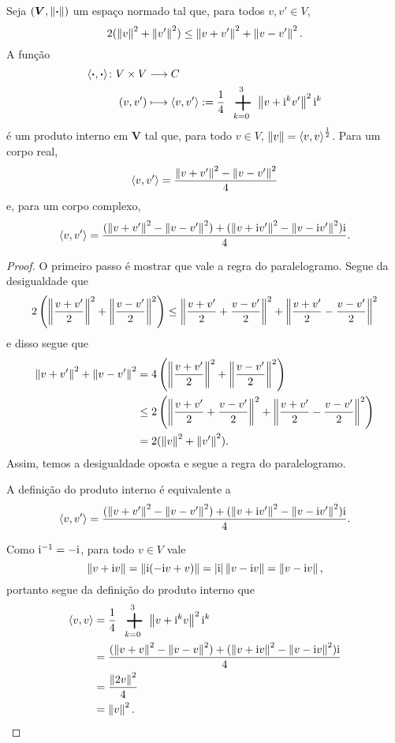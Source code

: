 \begin{proposition}
Seja $(\bm V,\left\Vert{\bm{\cdot}}\right\Vert)$ um espaço normado tal que, para todos $v,v' \in V$,
	\begin{equation*}
	2( \left\Vert{v}\right\Vert^2 + \left\Vert{v'}\right\Vert^2 ) \leq \left\Vert{v+v'}\right\Vert^2+\left\Vert{v-v'}\right\Vert^2.
	\end{equation*}
A função
	\begin{align*}
		\func{\inte{\var}{\var}}{V \times V}{C}{(v,v')}{\inte{v}{v'} := \frac{1}{4} \sum_{k=0}^{3} \nor{v+\ii^kv'}^2 \ii^k}
	\end{align*}
é um produto interno em $\bm V$ tal que, para todo $v \in V$, $\left\Vert{v}\right\Vert = \left\langle{v},{v}\right\rangle^{\frac{1}{2}}$. Para um corpo real,
	\begin{equation*}
	\left\langle{v},{v'}\right\rangle = \frac{\left\Vert{v+v'}\right\Vert^2 - \left\Vert{v-v'}\right\Vert^2}{4}
	\end{equation*}
e, para um corpo complexo,
	\begin{equation*}
	\left\langle{v},{v'}\right\rangle = \frac{(\left\Vert{v+v'}\right\Vert^2 - \left\Vert{v-v'}\right\Vert^2) + (\left\Vert{v+\mathrm{i}v'}\right\Vert^2 - \left\Vert{v-\mathrm{i}v'}\right\Vert^2) \mathrm{i}}{4}.
	\end{equation*}
\end{proposition}\begin{proof}
O primeiro passo é mostrar que vale a regra do paralelogramo. Segue da desigualdade que
	\begin{equation*}
		2\left( \left\Vert{\frac{v+v'}{2}}\right\Vert^2 + \left\Vert{\frac{v-v'}{2}}\right\Vert^2 \right) \leq \left\Vert{\frac{v+v'}{2} + \frac{v-v'}{2}}\right\Vert^2+\left\Vert{\frac{v+v'}{2} - \frac{v-v'}{2}}\right\Vert^2
	\end{equation*}
e disso segue que
	\begin{align*}
		\left\Vert{v+v'}\right\Vert^2 + \left\Vert{v-v'}\right\Vert^2 &= 4\left( \left\Vert{\frac{v+v'}{2}}\right\Vert^2 + \left\Vert{\frac{v-v'}{2}}\right\Vert^2 \right) \\
			&\leq 2\left( \left\Vert{\frac{v+v'}{2} + \frac{v-v'}{2}}\right\Vert^2+\left\Vert{\frac{v+v'}{2} - \frac{v-v'}{2}}\right\Vert^2 \right) \\
			&= 2(\left\Vert{v}\right\Vert^2 + \left\Vert{v'}\right\Vert^2).
	\end{align*}
Assim, temos a desigualdade oposta e segue a regra do paralelogramo.

A definição do produto interno é equivalente a
	\begin{equation*}
	\left\langle{v},{v'}\right\rangle = \frac{(\left\Vert{v+v'}\right\Vert^2 - \left\Vert{v-v'}\right\Vert^2) + (\left\Vert{v+\mathrm{i}v'}\right\Vert^2 - \left\Vert{v-\mathrm{i}v'}\right\Vert^2) \mathrm{i}}{4}.
	\end{equation*}

Como $\mathrm{i}^{-1} = -\mathrm{i}$, para todo $v \in V$ vale
	\begin{equation*}
	\left\Vert{v+\mathrm{i}v}\right\Vert = \left\Vert{\mathrm{i}(-\mathrm{i}v + v)}\right\Vert = \left\vert{\mathrm{i}}\right\vert\left\Vert{v-\mathrm{i}v}\right\Vert = \left\Vert{v-\mathrm{i}v}\right\Vert,
	\end{equation*}
portanto segue da definição do produto interno que
	\begin{align*}
	\inte{v}{v} &= \frac{1}{4} \sum_{k=0}^{3} \nor{v+\ii^kv}^2 \ii^k \\
		&= \frac{(\nor{v+v}^2 - \nor{v-v}^2) + (\nor{v+\ii v}^2 - \nor{v-\ii v}^2) \ii}{4} \\
		&= \frac{\nor{2v}^2}{4} \\
		&= \nor{v}^2.
	\end{align*}


\end{proof}
